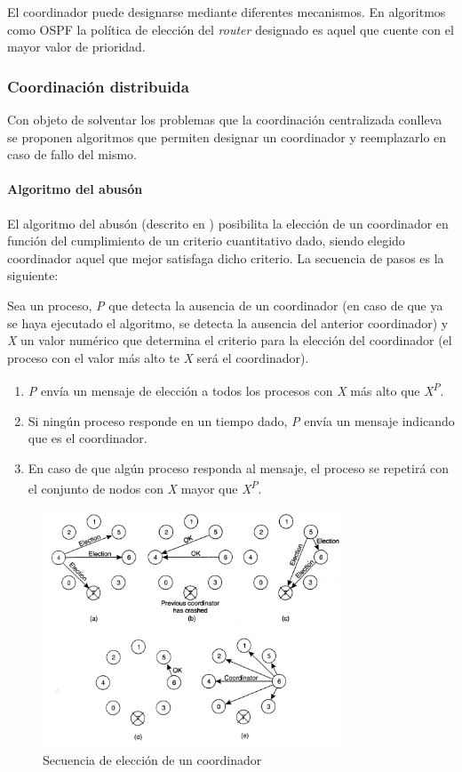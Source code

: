 El coordinador puede designarse mediante diferentes mecanismos. En algoritmos como OSPF\cite{rfc2328} la política de elección del \textit{router} designado es aquel que cuente con el mayor valor de prioridad.
\subsubsection{Coordinación distribuida}

Con objeto de solventar los problemas que la coordinación centralizada conlleva se proponen algoritmos que permiten designar un coordinador y reemplazarlo en caso de fallo del mismo.

\paragraph{Algoritmo del abusón}

El algoritmo del abusón (descrito en \cite{Coulouris:2011:DSC:2029110:Ch15}) posibilita la elección de un coordinador en función del cumplimiento de un criterio cuantitativo dado, siendo elegido coordinador aquel que mejor satisfaga dicho criterio. La secuencia de pasos es la siguiente:

Sea un proceso, \textit{P} que detecta la ausencia de un coordinador (en caso de que ya se haya ejecutado el algoritmo, se detecta la ausencia del anterior coordinador) y \textit{X} un valor numérico que determina el criterio para la elección del coordinador (el proceso con el valor más alto te \textit{X} será el coordinador).
\begin{enumerate}
\item \textit{P} envía un mensaje de elección a todos los procesos con \textit{X} más alto que \textit{X\textsuperscript{P}}.
\item Si ningún proceso responde en un tiempo dado, \textit{P} envía un mensaje indicando que es el coordinador.
\item En caso de que algún proceso responda al mensaje, el proceso se repetirá con el conjunto de nodos con \textit{X} mayor que \textit{X\textsuperscript{P}}.
\end{enumerate}

\begin{figure}[H]
  \centering
  \includegraphics[width=0.8\textwidth]{Chapter2/Figures/bully}
  \caption{Secuencia de elección de un coordinador}
  \label{fig:tanenbaum:bully}
\end{figure}


